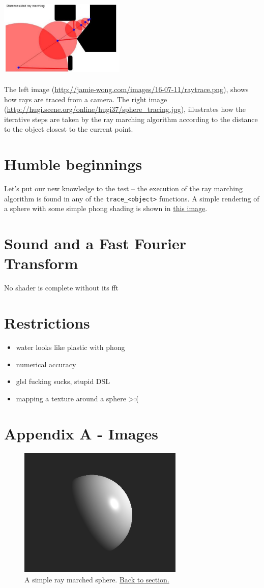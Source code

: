 \documentclass[abstract=off,oneside]{scrreprt}
\begin{document}
\includegraphics[width=0.45\textwidth]{./img/sphere_tracing.jpg}
\\\\
The left image (\url{http://jamie-wong.com/images/16-07-11/raytrace.png}),
shows how rays are traced from a camera. The right image
(\url{http://hugi.scene.org/online/hugi37/sphere_tracing.jpg}), illustrates
how the iterative steps are taken by the ray marching algorithm
according to the distance to the object closest to the current point.

\section*{Humble beginnings}
\label{sec-4}
\label{sec:beginnings}
Let's put our new knowledge to the test -- the execution of the ray
marching algorithm is found in any of the \verb~trace_<object>~
functions. A simple rendering of a sphere with some simple phong
shading is shown in \hyperref[fig:simplesphere]{this image}.

\section*{Sound and a Fast Fourier Transform}
\label{sec-5}
No shader is complete without its fft


\section*{Restrictions}
\label{sec-6}
\begin{itemize}
\item water looks like plastic with phong
\item numerical accuracy
\item glsl fucking sucks, stupid DSL
\item mapping a texture around a sphere >:(
\end{itemize}


\section*{Appendix A - Images}
\label{sec-7}

\begin{figure}[htb]
\centering
\includegraphics[width=0.70\textwidth]{./img/simplesphere.png}
\caption*{\label{fig:simplesphere}A simple ray marched sphere. \hyperref[sec:beginnings]{Back to section.}}
\end{figure}
\end{document}

